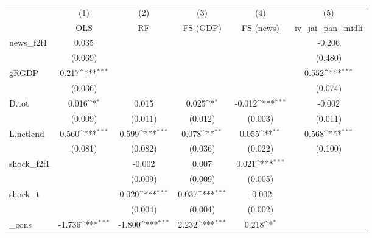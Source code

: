 {
\def\sym#1{\ifmmode^{#1}\else\(^{#1}\)\fi}
\begin{tabular}{l*{5}{c}}
\toprule
            &\multicolumn{1}{c}{(1)}&\multicolumn{1}{c}{(2)}&\multicolumn{1}{c}{(3)}&\multicolumn{1}{c}{(4)}&\multicolumn{1}{c}{(5)}\\
            &\multicolumn{1}{c}{OLS}&\multicolumn{1}{c}{RF}&\multicolumn{1}{c}{FS (GDP)}&\multicolumn{1}{c}{FS (news)}&\multicolumn{1}{c}{iv\_jai\_pan\_midli}\\
\midrule
news\_f2f1   &       0.035         &                     &                     &                     &      -0.206         \\
            &     (0.069)         &                     &                     &                     &     (0.480)         \\
\addlinespace
gRGDP       &       0.217\sym{***}&                     &                     &                     &       0.552\sym{***}\\
            &     (0.036)         &                     &                     &                     &     (0.074)         \\
\addlinespace
D.tot       &       0.016\sym{*}  &       0.015         &       0.025\sym{*}  &      -0.012\sym{***}&      -0.002         \\
            &     (0.009)         &     (0.011)         &     (0.012)         &     (0.003)         &     (0.011)         \\
\addlinespace
L.netlend   &       0.560\sym{***}&       0.599\sym{***}&       0.078\sym{**} &       0.055\sym{**} &       0.568\sym{***}\\
            &     (0.081)         &     (0.082)         &     (0.036)         &     (0.022)         &     (0.100)         \\
\addlinespace
shock\_f2f1  &                     &      -0.002         &       0.007         &       0.021\sym{***}&                     \\
            &                     &     (0.009)         &     (0.009)         &     (0.005)         &                     \\
\addlinespace
shock\_t     &                     &       0.020\sym{***}&       0.037\sym{***}&      -0.002         &                     \\
            &                     &     (0.004)         &     (0.004)         &     (0.002)         &                     \\
\addlinespace
\_cons      &      -1.736\sym{***}&      -1.800\sym{***}&       2.232\sym{***}&       0.218\sym{*}  &                     \\

\end{tabular}}
